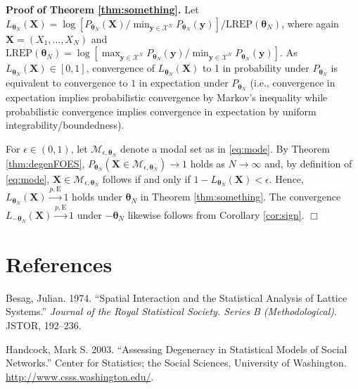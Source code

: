 \documentclass[]{article}
\theoremstyle{definition}
\newcommand{\REP}{\mathrm{LREP}}
\begin{document}
\textbf{Proof of Theorem \ref{thm:something}.} Let
\(L_{\boldsymbol \theta_{N}}(\boldsymbol X) = \log[ P_{\boldsymbol \theta_{N}}(\boldsymbol X)/ \min_{\boldsymbol y \in \mathcal{X}^N} P_{\boldsymbol \theta_{N}}(\boldsymbol y) ]/\REP(\boldsymbol \theta_{N})\),
where again \(\boldsymbol X=(X_1, \dots, X_N)\) and
\(\REP(\boldsymbol \theta_{N})= \log[\max_{\boldsymbol y \in \mathcal{X}^N} P_{\boldsymbol \theta_{N}}(\boldsymbol y)/ \min_{\boldsymbol y \in \mathcal{X}^N} P_{\boldsymbol \theta_{N}}(\boldsymbol y) ]\).
As \(L_{\boldsymbol \theta_{N}}(\boldsymbol X)\in[0,1]\), convergence of
\(L_{\boldsymbol \theta_{N}}(\boldsymbol X)\) to 1 in probability under
\(P_{\boldsymbol \theta_{N}}\) is equivalent to convergence to \(1\) in
expectation under \(P_{\boldsymbol \theta_{N}}\) (i.e., convergence in
expectation implies probabilistic convergence by Markov's inequality
while probabilistic convergence implies convergence in expectation by
uniform integrability/boundedness).

For \(\epsilon \in(0,1)\), let
\(\mathcal{M}_{\epsilon, \boldsymbol \theta_N}\) denote a modal set as
in \eqref{eq:mode}. By Theorem \ref{thm:degenFOES},
\(P_{\boldsymbol \theta_N}\left( \boldsymbol X\in \mathcal{M}_{\epsilon, \boldsymbol \theta_N}\right) \rightarrow 1\)
holds as \(N \rightarrow \infty\) and, by definition of \eqref{eq:mode},
\(\boldsymbol X\in \mathcal{M}_{\epsilon, \boldsymbol \theta_N}\)
follows if and only if
\(1-L_{\boldsymbol \theta_{N}}(\boldsymbol X)<\epsilon\). Hence,
\(L_{\boldsymbol \theta_{N}}(\boldsymbol X) \stackrel{p,\mathrm{E}}{\longrightarrow} 1\)
holds under \(\boldsymbol \theta_{N}\) in Theorem \ref{thm:something}.
The convergence
\(L_{-\boldsymbol \theta_{N}}(\boldsymbol X) \stackrel{p,\mathrm{E}}{\longrightarrow} 1\)
under \(-\boldsymbol \theta_{N}\) likewise follows from Corollary
\ref{cor:sign}. \hfill \(\Box\)

\clearpage

\section*{References}\label{references}

\hypertarget{refs}{}
\hypertarget{ref-besag1974spatial}{}
Besag, Julian. 1974. ``Spatial Interaction and the Statistical Analysis
of Lattice Systems.'' \emph{Journal of the Royal Statistical Society.
Series B (Methodological)}. JSTOR, 192--236.

\hypertarget{ref-handcock2003assessing}{}
Handcock, Mark S. 2003. ``Assessing Degeneracy in Statistical Models of
Social Networks.'' Center for Statistics; the Social Sciences,
University of Washington. \url{http://www.csss.washington.edu/}.
\end{document}

